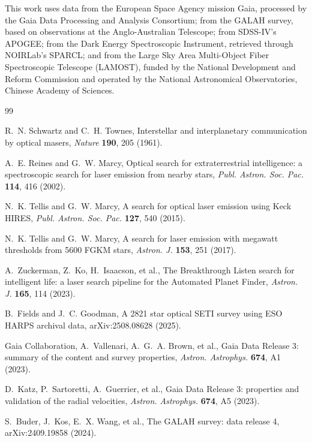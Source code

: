 \documentclass[3p,11pt]{elsarticle}
\begin{document}
This work uses data from the European Space Agency mission Gaia, processed by the Gaia
Data Processing and Analysis Consortium; from the GALAH survey, based on observations at
the Anglo-Australian Telescope; from SDSS-IV's APOGEE; from the Dark Energy Spectroscopic
Instrument, retrieved through NOIRLab's SPARCL; and from the Large Sky Area Multi-Object
Fiber Spectroscopic Telescope (LAMOST), funded by the National Development and Reform
Commission and operated by the National Astronomical Observatories, Chinese Academy of
Sciences.

\begin{thebibliography}{99}\small\raggedright
\setlength{\itemsep}{1pt}

R.~N. Schwartz and C.~H. Townes, Interstellar and interplanetary communication by
optical masers, \emph{Nature} \textbf{190}, 205 (1961).

A.~E. Reines and G.~W. Marcy, Optical search for extraterrestrial intelligence: a
spectroscopic search for laser emission from nearby stars, \emph{Publ. Astron. Soc.
Pac.} \textbf{114}, 416 (2002).

N.~K. Tellis and G.~W. Marcy, A search for optical laser emission using Keck HIRES,
\emph{Publ. Astron. Soc. Pac.} \textbf{127}, 540 (2015).

N.~K. Tellis and G.~W. Marcy, A search for laser emission with megawatt thresholds from
5600 FGKM stars, \emph{Astron. J.} \textbf{153}, 251 (2017).

A.~Zuckerman, Z.~Ko, H.~Isaacson, et al., The Breakthrough Listen search for
intelligent life: a laser search pipeline for the Automated Planet Finder,
\emph{Astron. J.} \textbf{165}, 114 (2023).

B.~Fields and J.~C. Goodman, A 2821 star optical SETI survey using ESO HARPS archival
data, arXiv:2508.08628 (2025).

Gaia Collaboration, A.~Vallenari, A.~G.~A. Brown, et al., Gaia Data Release 3: summary
of the content and survey properties, \emph{Astron. Astrophys.} \textbf{674}, A1 (2023).

D.~Katz, P.~Sartoretti, A.~Guerrier, et al., Gaia Data Release 3: properties and
validation of the radial velocities, \emph{Astron. Astrophys.} \textbf{674}, A5 (2023).

S.~Buder, J.~Kos, E.~X. Wang, et al., The GALAH survey: data release 4,
arXiv:2409.19858 (2024).


\end{thebibliography}
\end{document}
